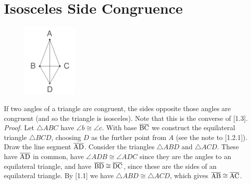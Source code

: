 \documentclass{report}
\begin{document}
\section{Isosceles Side Congruence}
\begin{figure} %
    \centering
    \includegraphics[width=0.25\textwidth]{ISOC2}
\end{figure}
If two angles of a triangle are congruent, the sides opposite those angles are congruent (and so the triangle is isosceles). Note that this is the converse of [1.3].
\\[\baselineskip]
\textit{Proof.} Let $\triangle{ABC}$ have $\angle b \cong \angle c$. With base $\overline{\rm BC}$ we construct the equilateral triangle $\triangle{BCD}$, choosing $D$ as the further point from $A$ (see the note to [1.2.1]). Draw the line segment $\overline{\rm AD}$.  Consider the triangles $\triangle{ABD}$ and $\triangle{ACD}$. These have $\overline{\rm AD}$ in common, have $\angle ADB \cong \angle ADC$ since they are the angles to an equilateral triangle, and have $\overline{\rm BD} \cong \overline{\rm DC}$, since these are the sides of an equilateral triangle. By [1.1] we have $\triangle{ABD} \cong \triangle{ACD}$, which gives $\overline{\rm AB} \cong \overline{\rm AC}$.
\end{document}
